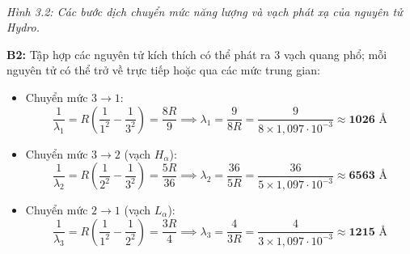 \documentclass[11pt,a4paper]{article}
\renewcommand{\boldsymbol}[1]{\symbf{#1}}
\begin{document}
\begin{center}\begin{minipage}{\linewidth}\centering
{}\\[0.1cm]
\textit{Hình 3.2: Các bước dịch chuyển mức năng lượng và vạch phát xạ của nguyên tử Hydro.}
\end{minipage}\end{center}

\textbf{B2:} Tập hợp các nguyên tử kích thích có thể phát ra 3 vạch quang phổ; mỗi nguyên tử có thể trở về trực tiếp hoặc qua các mức trung gian:
\begin{itemize}[leftmargin=*, topsep=1pt, itemsep=1pt]
  \item Chuyển mức $3 \to 1$:
  \begin{equation*}
      \frac{1}{\lambda_1} = R\left(\frac{1}{1^2} - \frac{1}{3^2}\right) = \frac{8R}{9} \implies \lambda_1 = \frac{9}{8R} = \frac{9}{8 \times 1{,}097 \cdot 10^{-3}} \approx \boldsymbol{1026\text{ \AA}}
  \end{equation*}
  \item Chuyển mức $3 \to 2$ (vạch $H_\alpha$):
  \begin{equation*}
      \frac{1}{\lambda_2} = R\left(\frac{1}{2^2} - \frac{1}{3^2}\right) = \frac{5R}{36} \implies \lambda_2 = \frac{36}{5R} = \frac{36}{5 \times 1{,}097 \cdot 10^{-3}} \approx \boldsymbol{6563\text{ \AA}}
  \end{equation*}
  \item Chuyển mức $2 \to 1$ (vạch $L_\alpha$):
  \begin{equation*}
      \frac{1}{\lambda_3} = R\left(\frac{1}{1^2} - \frac{1}{2^2}\right) = \frac{3R}{4} \implies \lambda_3 = \frac{4}{3R} = \frac{4}{3 \times 1{,}097 \cdot 10^{-3}} \approx \boldsymbol{1215\text{ \AA}}
  \end{equation*}
\end{itemize}
\end{document}

